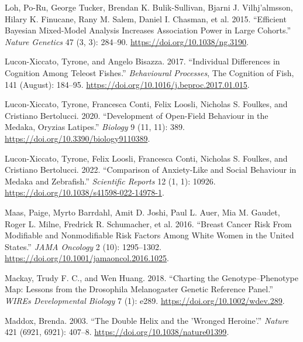 \documentclass[
]{book}
\newlength{\cslhangindent}
\newlength{\cslentryspacingunit} %
\newenvironment{CSLReferences}[2] %
 {%
  \setlength{\parindent}{0pt}
  \ifodd #1
  \let\oldpar\par
  \def\par{\hangindent=\cslhangindent\oldpar}
  \fi
  \setlength{\parskip}{#2\cslentryspacingunit}
 }%
 {}
\begin{document}
\begin{CSLReferences}{1}{0}
\leavevmode{}%
Loh, Po-Ru, George Tucker, Brendan K. Bulik-Sullivan, Bjarni J. Vilhj'almsson, Hilary K. Finucane, Rany M. Salem, Daniel I. Chasman, et al. 2015. {``Efficient {Bayesian} Mixed-Model Analysis Increases Association Power in Large Cohorts.''} \emph{Nature Genetics} 47 (3, 3): 284--90. \url{https://doi.org/10.1038/ng.3190}.

\leavevmode{}%
Lucon-Xiccato, Tyrone, and Angelo Bisazza. 2017. {``Individual Differences in Cognition Among Teleost Fishes.''} \emph{Behavioural Processes}, The {Cognition} of {Fish}, 141 (August): 184--95. \url{https://doi.org/10.1016/j.beproc.2017.01.015}.

\leavevmode{}%
Lucon-Xiccato, Tyrone, Francesca Conti, Felix Loosli, Nicholas S. Foulkes, and Cristiano Bertolucci. 2020. {``Development of {Open-Field Behaviour} in the {Medaka}, {Oryzias} Latipes.''} \emph{Biology} 9 (11, 11): 389. \url{https://doi.org/10.3390/biology9110389}.

\leavevmode{}%
Lucon-Xiccato, Tyrone, Felix Loosli, Francesca Conti, Nicholas S. Foulkes, and Cristiano Bertolucci. 2022. {``Comparison of Anxiety-Like and Social Behaviour in Medaka and Zebrafish.''} \emph{Scientific Reports} 12 (1, 1): 10926. \url{https://doi.org/10.1038/s41598-022-14978-1}.

\leavevmode{}%
Maas, Paige, Myrto Barrdahl, Amit D. Joshi, Paul L. Auer, Mia M. Gaudet, Roger L. Milne, Fredrick R. Schumacher, et al. 2016. {``Breast {Cancer Risk From Modifiable} and {Nonmodifiable Risk Factors Among White Women} in the {United States}.''} \emph{JAMA Oncology} 2 (10): 1295--1302. \url{https://doi.org/10.1001/jamaoncol.2016.1025}.

\leavevmode{}%
Mackay, Trudy F. C., and Wen Huang. 2018. {``Charting the Genotype--Phenotype Map: Lessons from the {Drosophila} Melanogaster {Genetic Reference Panel}.''} \emph{WIREs Developmental Biology} 7 (1): e289. \url{https://doi.org/10.1002/wdev.289}.

\leavevmode{}%
Maddox, Brenda. 2003. {``The Double Helix and the 'Wronged Heroine'.''} \emph{Nature} 421 (6921, 6921): 407--8. \url{https://doi.org/10.1038/nature01399}.


\end{CSLReferences}
\end{document}
